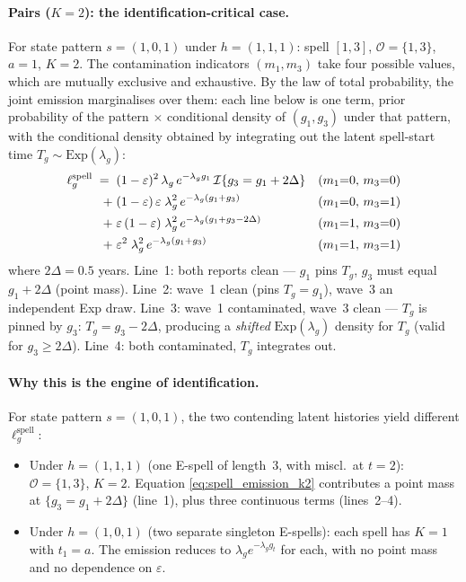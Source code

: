\documentclass[12pt]{article}
\begin{document}
\paragraph{Pairs (\(K = 2\)): the identification-critical case.}
For state pattern \(s = (1,0,1)\) under \(h = (1,1,1)\): spell \([1,3]\),
\(\mathcal{O} = \{1,3\}\), \(a = 1\), \(K = 2\). The contamination
indicators \((m_1, m_3)\) take four possible values, which are
mutually exclusive and exhaustive. By the law of total probability, the
joint emission marginalises over them: each line below is one term, prior probability of the pattern \(\times\) conditional density of
\((g_1, g_3)\) under that pattern, with the conditional density
obtained by integrating out the latent spell-start time
\(T_g \sim \mathrm{Exp}(\lambda_g)\):
\begin{align}
\ell^{\mathrm{spell}}_g \;=\;\;
  & (1-\varepsilon)^2\,\lambda_g\, e^{-\lambda_g g_1}\,
    \mathcal{I}\{g_3 = g_1 + 2\Delta\}
    && (m_1{=}0,\, m_3{=}0) \notag \\
+\; & (1-\varepsilon)\,\varepsilon\;\lambda_g^2\,
    e^{-\lambda_g(g_1 + g_3)}
    && (m_1{=}0,\, m_3{=}1) \notag \\
+\; & \varepsilon\,(1-\varepsilon)\;\lambda_g^2\,
    e^{-\lambda_g(g_1 + g_3 - 2\Delta)}
    && (m_1{=}1,\, m_3{=}0) \notag \\
+\; & \varepsilon^2\;\lambda_g^2\,
    e^{-\lambda_g(g_1 + g_3)}
    && (m_1{=}1,\, m_3{=}1)
\label{eq:spell_emission_k2}
\end{align}
where \(2\Delta = 0.5\) years. Line~1: both reports clean --- \(g_1\) pins
\(T_g\), \(g_3\) must equal \(g_1 + 2\Delta\) (point mass). Line~2: wave~1
clean (pins \(T_g = g_1\)), wave~3 an independent Exp draw. Line~3:
wave~1 contaminated, wave~3 clean --- \(T_g\) is pinned by \(g_3\):
\(T_g = g_3 - 2\Delta\), producing a \emph{shifted}
\(\mathrm{Exp}(\lambda_g)\) density for \(T_g\) (valid for
\(g_3 \ge 2\Delta\)). Line~4: both contaminated, \(T_g\) integrates out.

\paragraph{Why this is the engine of identification.}
For state pattern \(s = (1,0,1)\), the two contending latent histories
yield different \(\ell^{\mathrm{spell}}_g\):

\begin{itemize}
\item Under \(h = (1,1,1)\) (one E-spell of length~3, with miscl.\ at
  \(t=2\)): \(\mathcal{O} = \{1,3\}\), \(K = 2\). Equation
  \eqref{eq:spell_emission_k2} contributes a point mass at
  \(\{g_3 = g_1 + 2\Delta\}\) (line~1), plus three continuous terms
  (lines~2--4).
\item Under \(h = (1,0,1)\) (two separate singleton E-spells): each
  spell has \(K = 1\) with \(t_1 = a\). The emission reduces to
  \(\lambda_g e^{-\lambda_g g_t}\) for each, with no point mass and no
  dependence on \(\varepsilon\).
\end{itemize}
\end{document}

